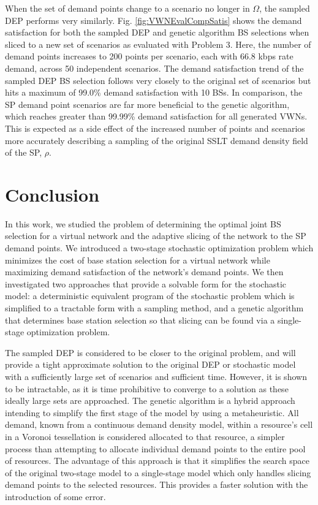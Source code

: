 \documentclass[conference]{IEEEtran}
\begin{document}
When the set of demand points change to a scenario no longer in $\Omega$, the sampled DEP performs very similarly.  Fig. \ref{fig:VWNEvalCompSatis} shows the demand satisfaction for both the sampled DEP and genetic algorithm BS selections when sliced to a new set of scenarios as evaluated with Problem 3.  Here, the number of demand points increases to 200 points per scenario, each with 66.8 kbps rate demand, across 50 independent scenarios.  The demand satisfaction trend of the sampled DEP BS selection follows very closely to the original set of scenarios but hits a maximum of 99.0\% demand satisfaction with 10 BSs.  In comparison, the SP demand point scenarios are far more beneficial to the genetic algorithm, which reaches greater than 99.99\% demand satisfaction for all generated VWNs.  This is expected as a side effect of the increased number of points and scenarios more accurately describing a sampling of the original SSLT demand density field of the SP, $\rho$.

\section{Conclusion} \label{sec:conclusion}

In this work, we studied the problem of determining the optimal joint BS selection for a virtual network and the adaptive slicing of the network to the SP demand points.  We introduced a two-stage stochastic optimization problem which minimizes the cost of base station selection for a virtual network while maximizing demand satisfaction of the network's demand points.  We then investigated two approaches that provide a solvable form for the stochastic model: a deterministic equivalent program of the stochastic problem which is simplified to a tractable form with a sampling method, and a genetic algorithm that determines base station selection so that slicing can be found via a single-stage optimization problem.

The sampled DEP is considered to be closer to the original problem, and will provide a tight approximate solution to the original DEP or stochastic model with a sufficiently large set of scenarios and sufficient time.  However, it is shown to be intractable, as it is time prohibitive to converge to a solution as these ideally large sets are approached.  The genetic algorithm is a hybrid approach intending to simplify the first stage of the model by using a metaheuristic.  All demand, known from a continuous demand density model, within a resource's cell in a Voronoi tessellation is considered allocated to that resource, a simpler process than attempting to allocate individual demand points to the entire pool of resources.  The advantage of this approach is that it simplifies the search space of the original two-stage model to a single-stage model which only handles slicing demand points to the selected resources.  This provides a faster solution with the introduction of some error.
\end{document}
